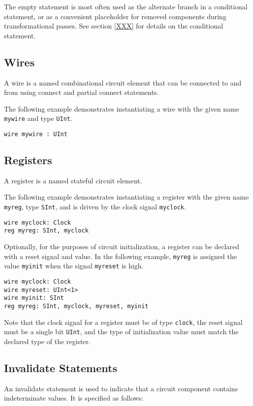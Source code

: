 \documentclass[12pt]{article}
\begin{document}
The empty statement is most often used as the alternate branch in a conditional statement, or as a convenient placeholder for removed components during transformational passes. See section \ref{XXX} for details on the conditional statement.

\subsection{Wires}
A wire is a named combinational circuit element that can be connected to and from using connect and partial connect statements.

The following example demonstrates instantiating a wire with the given name \verb|mywire| and type \verb|UInt|.

\begin{verbatim}
wire mywire : UInt
\end{verbatim}

\subsection{Registers}
A register is a named stateful circuit element.

The following example demonstrates instantiating a register with the given name \verb|myreg|, type \verb|SInt|, and is driven by the clock signal \verb|myclock|. 

\begin{verbatim}
wire myclock: Clock
reg myreg: SInt, myclock
\end{verbatim}

Optionally, for the purposes of circuit initialization, a register can be declared with a reset signal and value. In the following example, \verb|myreg| is assigned the value \verb|myinit| when the signal \verb|myreset| is high.

\begin{verbatim}
wire myclock: Clock
wire myreset: UInt<1>
wire myinit: SInt
reg myreg: SInt, myclock, myreset, myinit
\end{verbatim}

Note that the clock signal for a register must be of type \verb|clock|, the reset signal must be a single bit \verb|UInt|, and the type of initialization value must match the declared type of the register.

\subsection{Invalidate Statements}
An invalidate statement is used to indicate that a circuit component contains indeterminate values. It is specified as follows:
\end{document}
